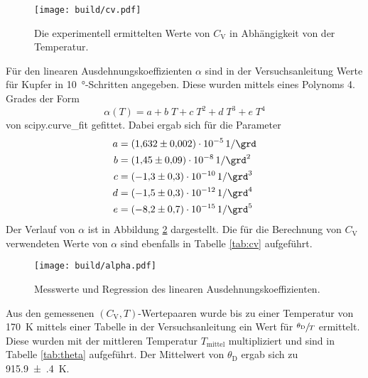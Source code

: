 \begin{figure}
  \centering
  \texttt{[image: build/cv.pdf]}      %
    \caption{Die experimentell ermittelten Werte von $C_\text{V}$ in Abhängigkeit
             von der Temperatur.}
  \label{fig:cv}
\end{figure}
\FloatBarrier


\FloatBarrier

Für den linearen Ausdehnungskoeffizienten $\alpha$ sind in der Versuchsanleitung
\cite[p.~5]{anleitung}
Werte für Kupfer in \SI{10}{\degree}-Schritten angegeben. Diese wurden mittels eines Polynoms
4. Grades der Form
\begin{equation*}
    \alpha(T) = a + b\;T + c\;T^2 + d\;T^3 + e\;T^4
\end{equation*}
von scipy.curve\_fit gefittet. Dabei ergab sich für die Parameter
\begin{align*}
    a &= \SI{1.632(2)e-05}{1\per\grd} \\
    b &= \SI{1.45(9)e-08}{1\per\raiseto{2}\grd} \\
    c &= \SI{-1.3(3)e-10}{1\per\raiseto{3}\grd} \\
    d &= \SI{-1.5(3)e-12}{1\per\raiseto{4}\grd} \\
    e &= \SI{-8.2(7)e-15}{1\per\raiseto{5}\grd}
\end{align*}
Der Verlauf von $\alpha$ ist in Abbildung \ref{fig:alpha} dargestellt.
Die für die Berechnung von $C_\text{V}$ verwendeten Werte von $\alpha$ sind ebenfalls
in Tabelle \ref{tab:cv} aufgeführt.

\begin{figure}
  \centering
  \texttt{[image: build/alpha.pdf]}      %
    \caption{Messwerte und Regression des linearen Ausdehnungskoeffizienten.}
  \label{fig:alpha}
\end{figure}
\FloatBarrier

\FloatBarrier
Aus den gemessenen $(C_\text{V}, T)$-Wertepaaren wurde bis zu einer Temperatur von
\SI{170}{\kelvin} mittels einer Tabelle in der
Versuchsanleitung \cite[p.~5]{anleitung} ein Wert für $\sfrac{\theta_\text{D}}{T}$ ermittelt. Diese wurden
mit der mittleren Temperatur $T_\text{mittel}$ multipliziert und sind
in Tabelle \ref{tab:theta} aufgeführt. Der Mittelwert von $\theta_\text{D}$ ergab sich
zu \SI{915.9(4)}{\kelvin}.


